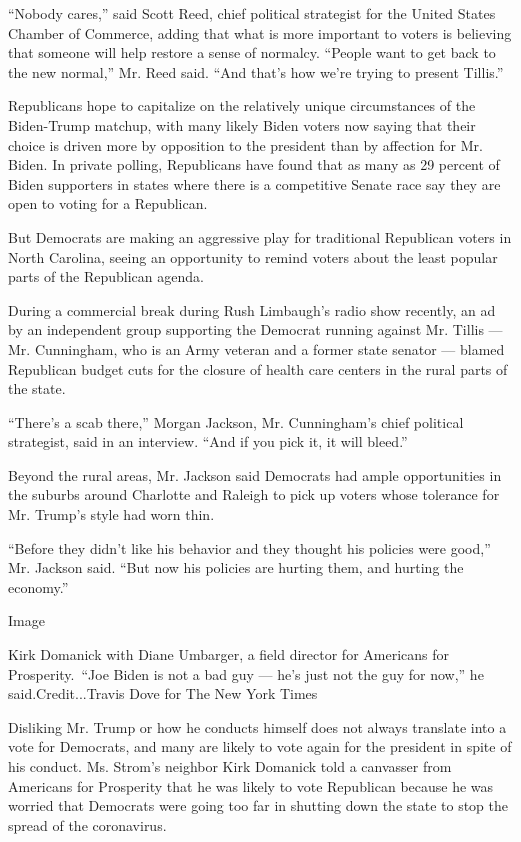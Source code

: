 ``Nobody cares,'' said Scott Reed, chief political strategist for the
United States Chamber of Commerce, adding that what is more important to
voters is believing that someone will help restore a sense of normalcy.
``People want to get back to the new normal,'' Mr. Reed said. ``And
that's how we're trying to present Tillis.''

Republicans hope to capitalize on the relatively unique circumstances of
the Biden-Trump matchup, with many likely Biden voters now saying that
their choice is driven more by opposition to the president than by
affection for Mr. Biden. In private polling, Republicans have found that
as many as 29 percent of Biden supporters in states where there is a
competitive Senate race say they are open to voting for a Republican.

But Democrats are making an aggressive play for traditional Republican
voters in North Carolina, seeing an opportunity to remind voters about
the least popular parts of the Republican agenda.

During a commercial break during Rush Limbaugh's radio show recently, an
ad by an independent group supporting the Democrat running against Mr.
Tillis --- Mr. Cunningham, who is an Army veteran and a former state
senator --- blamed Republican budget cuts for the closure of health care
centers in the rural parts of the state.

``There's a scab there,'' Morgan Jackson, Mr. Cunningham's chief
political strategist, said in an interview. ``And if you pick it, it
will bleed.''

Beyond the rural areas, Mr. Jackson said Democrats had ample
opportunities in the suburbs around Charlotte and Raleigh to pick up
voters whose tolerance for Mr. Trump's style had worn thin.

``Before they didn't like his behavior and they thought his policies
were good,'' Mr. Jackson said. ``But now his policies are hurting them,
and hurting the economy.''

Image

Kirk Domanick with Diane Umbarger, a field director for Americans for
Prosperity.~``Joe Biden is not a bad guy --- he's just not the guy for
now,'' he said.Credit...Travis Dove for The New York Times

Disliking Mr. Trump or how he conducts himself does not always translate
into a vote for Democrats, and many are likely to vote again for the
president in spite of his conduct. Ms. Strom's neighbor Kirk Domanick
told a canvasser from Americans for Prosperity that he was likely to
vote Republican because he was worried that Democrats were going too far
in shutting down the state to stop the spread of the coronavirus.

